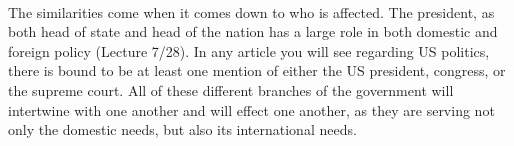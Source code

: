 \documentclass[12pt]{article}
\begin{document}
\paragraph{}
The similarities come when it comes down to who is affected. The
president, as both head of state and head of the nation has a large
role in both domestic and foreign policy (Lecture 7/28). In any
article you will see regarding US politics, there is bound to be at
least one mention of either the US president, congress, or the supreme
court. All of these different branches of the government will
intertwine with one another and will effect one another, as they are
serving not only the domestic needs, but also its international
needs. 
\end{document}
